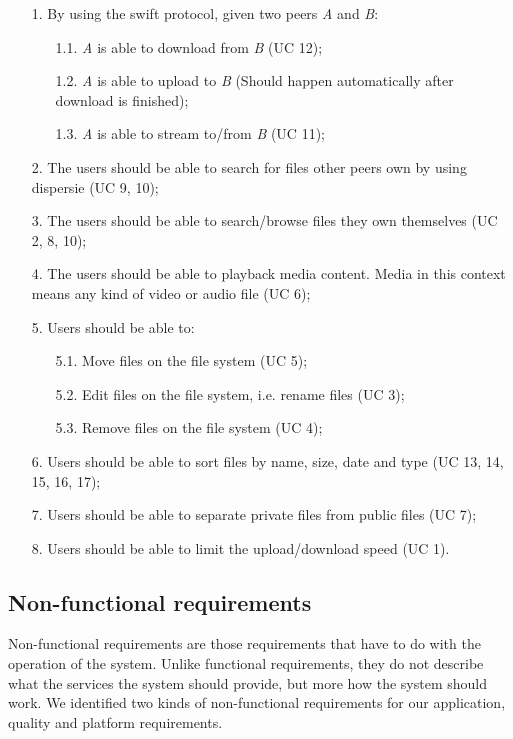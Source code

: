\begin{itemize}
\item[1.] By using the swift protocol, given two peers \textit{A} and \textit{B}:
	\begin{itemize}
	\item[1.1.] \textit{A} is able to download from \textit{B} (UC 12);
	\item[1.2.] \textit{A} is able to upload to \textit{B} (Should happen automatically after download is finished);
	\item[1.3.] \textit{A} is able to stream to/from \textit{B} (UC 11);
	\end{itemize}
\item[2.] The users should be able to search for files other peers own by using dispersie (UC 9, 10);
\item[3.] The users should be able to search/browse files they own themselves (UC 2, 8, 10);
\item[4.] The users should be able to playback media content. 
		  Media in this context means any kind of video or audio file (UC 6);
\item[5.] Users should be able to:
	\begin{itemize}
	\item[5.1.] Move files on the file system (UC 5);
	\item[5.2.] Edit files on the file system, i.e. rename files (UC 3);	
	\item[5.3.] Remove files on the file system (UC 4);
	
	\end{itemize}
\item[6.] Users should be able to sort files by name, size, date and type (UC 13, 14, 15, 16, 17); 
\item[7.] Users should be able to separate private files from public files (UC 7);
\item[8.] Users should be able to limit the upload/download speed (UC 1). 
\end{itemize} 

\subsection{Non-functional requirements}
Non-functional requirements are those requirements that have to do with the operation of the system. 
Unlike functional requirements, they do not describe what the services the system should provide, 
but more how the system should work. We identified two kinds of non-functional requirements for our application, 
quality and platform requirements.

